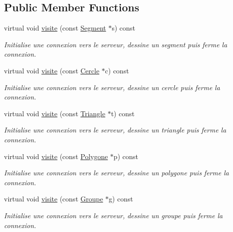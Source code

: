 \subsection*{Public Member Functions}
\begin{DoxyCompactItemize}
\item 
virtual void \hyperlink{class_visiteur_dessin_a39d12a331fcc80c183fc706cdb2d394a}{visite} (const \hyperlink{class_segment}{Segment} $\ast$s) const
\begin{DoxyCompactList}\small\item\em Initialise une connexion vers le serveur, dessine un segment puis ferme la connexion. \end{DoxyCompactList}\item 
virtual void \hyperlink{class_visiteur_dessin_ab757769d7c4bf7eac6263eecc8554896}{visite} (const \hyperlink{class_cercle}{Cercle} $\ast$c) const
\begin{DoxyCompactList}\small\item\em Initialise une connexion vers le serveur, dessine un cercle puis ferme la connexion. \end{DoxyCompactList}\item 
virtual void \hyperlink{class_visiteur_dessin_a8278a3991c52c9d00e5ad5a051faacfe}{visite} (const \hyperlink{class_triangle}{Triangle} $\ast$t) const
\begin{DoxyCompactList}\small\item\em Initialise une connexion vers le serveur, dessine un triangle puis ferme la connexion. \end{DoxyCompactList}\item 
virtual void \hyperlink{class_visiteur_dessin_a59ef1f9a400906300fa4e6d3c1ec0ea1}{visite} (const \hyperlink{class_polygone}{Polygone} $\ast$p) const
\begin{DoxyCompactList}\small\item\em Initialise une connexion vers le serveur, dessine un polygone puis ferme la connexion. \end{DoxyCompactList}\item 
virtual void \hyperlink{class_visiteur_dessin_a295e7bd446e4650257d0cb8c4d8c9ec5}{visite} (const \hyperlink{class_groupe}{Groupe} $\ast$g) const
\begin{DoxyCompactList}\small\item\em Initialise une connexion vers le serveur, dessine un groupe puis ferme la connexion. \end{DoxyCompactList}\end{DoxyCompactItemize}



